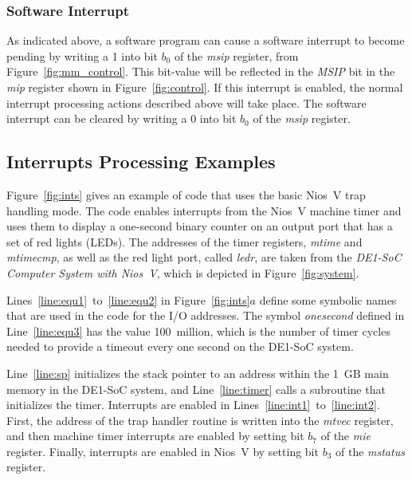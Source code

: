 \documentclass[11pt, twoside, pdftex]{article}
\begin{document}
\subsubsection{Software Interrupt}
\label{sec:swi}

As indicated above, a software program can cause a software interrupt to become pending by
writing a 1 into bit $b_0$ of the {\it msip} register, from Figure~\ref{fig:mm_control}.
This bit-value will be reflected in the {\it MSIP} bit in the {\it mip} register shown 
in Figure~\ref{fig:control}. If this interrupt is enabled, the normal interrupt processing 
actions described above will take place. The software interrupt can be cleared by writing a 0 
into bit $b_0$ of the {\it msip} register.

\subsection{Interrupts Processing Examples}

Figure~\ref{fig:ints} gives an example of code that uses the basic Nios~V trap handling mode.
The code
enables interrupts from the Nios~V machine timer and uses them to display a one-second binary
counter on an output port that has a set of red lights (LEDs). The addresses of the timer
registers, {\it mtime} and {\it mtimecmp}, as well as the red light port, called {\it ledr},
are taken from the {\it DE1-SoC Computer System with Nios~V}, which is depicted in 
Figure~\ref{fig:system}. 

Lines~\ref{line:equ1}~to~\ref{line:equ2} in Figure~\ref{fig:ints}$a$ define some symbolic 
names that are used in the code for the I/O addresses. The symbol {\it onesecond}
defined in Line~\ref{line:equ3} has the value 100~million, which is the number of timer 
cycles needed to provide a timeout every one second on the DE1-SoC system.

Line~\ref{line:sp} initializes the stack pointer to an address within the 1~GB main memory 
in the DE1-SoC system, and Line~\ref{line:timer} calls a subroutine that initializes the timer. 
Interrupts are enabled in Lines~\ref{line:int1}~to~\ref{line:int2}. First, the address of
the trap handler routine is written into the {\it mtvec} register, and then machine timer 
interrupts are enabled by setting bit $b_7$ of the {\it mie} register. Finally, interrupts 
are enabled in Nios~V by setting bit $b_3$ of the {\it mstatus} register.
\end{document}

